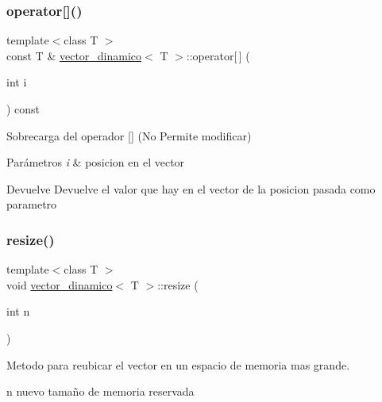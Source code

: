 \subsubsection{\texorpdfstring{operator[]()}{operator[]()}\hspace{0.1cm}{\footnotesize\ttfamily [2/2]}}
{\footnotesize\ttfamily template$<$class T $>$ \\
const T \& \hyperlink{classvector__dinamico}{vector\+\_\+dinamico}$<$ T $>$\+::operator\mbox{[}$\,$\mbox{]} (\begin{DoxyParamCaption}\item[{int}]{i }\end{DoxyParamCaption}) const}



Sobrecarga del operador \mbox{[}\mbox{]} (No Permite modificar) 


\begin{DoxyParams}{Parámetros}
{\em i} & posicion en el vector \\
\hline
\end{DoxyParams}
\begin{DoxyReturn}{Devuelve}
Devuelve el valor que hay en el vector de la posicion pasada como parametro 
\end{DoxyReturn}
\mbox{\label{classvector__dinamico_a7b8e98c5f43fd59ab0843f6f24b409d7}} 
\subsubsection{\texorpdfstring{resize()}{resize()}}
{\footnotesize\ttfamily template$<$class T $>$ \\
void \hyperlink{classvector__dinamico}{vector\+\_\+dinamico}$<$ T $>$\+::resize (\begin{DoxyParamCaption}\item[{int}]{n }\end{DoxyParamCaption})}



Metodo para reubicar el vector en un espacio de memoria mas grande. 

n nuevo tamaño de memoria reservada \mbox{\label{classvector__dinamico_aacef86aaef4e738716884b60e8b3b723}} 
